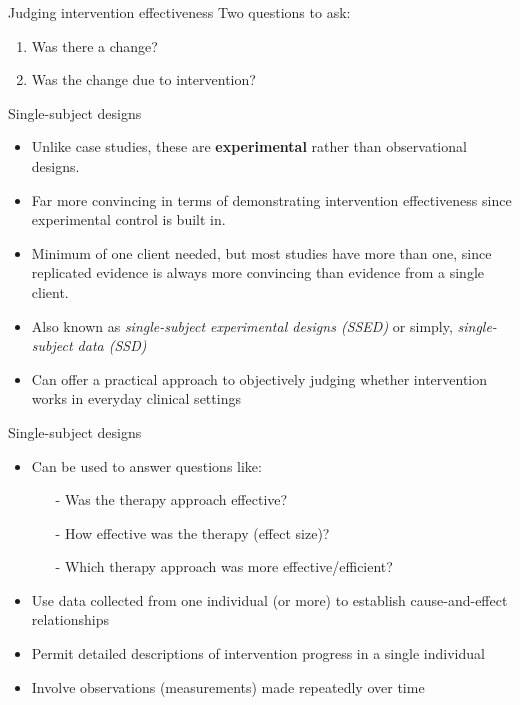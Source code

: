 \documentclass{beamer}
\begin{document}
%
\begin{frame}
\center{\Huge{\textcolor{darkgray}{Single-Subject Designs}}}
\end{frame}

% 
\begin{frame}{Judging intervention effectiveness}
Two questions to ask:
	\begin{enumerate}
	\item Was there a change?
	\item Was the change due to intervention?
	\end{enumerate}
\end{frame}

% 
\begin{frame}{Single-subject designs}
	\begin{itemize}
	\item Unlike case studies, these are \textbf{experimental} rather than observational designs. 
	\item Far more convincing in terms of demonstrating intervention effectiveness since experimental control is built in.
	\item Minimum of one client needed, but most studies have more than one, since replicated evidence is always more convincing than evidence from a single client.
	\item Also known as \emph{single-subject experimental designs (SSED)} or simply, \emph{single-subject data (SSD)}
	\item Can offer a practical approach to objectively judging whether intervention works in everyday clinical settings
	\end{itemize}
\end{frame}

% 
\begin{frame}{Single-subject designs}
	\begin{itemize}
	\item Can be used to answer questions like:
		\begin{itemize}
		\item[-] Was the therapy approach effective?
		\item[-] How effective was the therapy (effect size)?
		\item[-] Which therapy approach was more effective/efficient?
		\end{itemize}
	\item Use data collected from one individual (or more) to establish cause-and-effect relationships
	\item Permit detailed descriptions of intervention progress in a single individual
	\item Involve observations (measurements) made repeatedly over time
	\end{itemize}
\end{frame}
\end{document}
